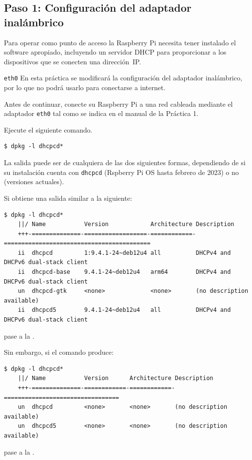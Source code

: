 \documentclass[letterpaper,10.5pt]{article}
\begin{document}
%
%
\subsection{Paso 1: Configuración del adaptador inalámbrico}%
\label{sec:adapter}

Para operar como punto de acceso la Raspberry Pi necesita tener instalado el software apropiado, incluyendo un servidor DHCP para proporcionar a los dispositivos que se conecten una dirección~IP. %

\begin{yellowbox}{\texttt{eth0}}
	En esta práctica se modificará la configuración del adaptador inalámbrico, por lo que no podrá usarlo para conectarse a internet.

	Antes de continuar, conecte su Raspberry Pi a una red cableada mediante el adaptador \texttt{eth0} tal como se indica en el manual de la Práctica 1.
\end{yellowbox}

Ejecute el siguiente comando.
\begin{Verbatim}[gobble=1,commentchar=\%]
	$ dpkg -l dhcpcd*
\end{Verbatim}

\noindent
La salida puede ser de cualquiera de las dos siguientes formas, dependiendo de si su instalación cuenta con \texttt{dhcpcd} (Rspberry Pi OS hasta febrero de 2023) o no (versiones actuales).

\medskip{}

\noindent
Si obtiene una salida similar a la siguiente:
\begin{Verbatim}[gobble=1,commentchar=\%]
	$ dpkg -l dhcpcd*
	||/ Name           Version            Architecture Description
	+++-==============-==================-============-==========================================
	ii  dhcpcd         1:9.4.1-24~deb12u4 all          DHCPv4 and DHCPv6 dual-stack client
	ii  dhcpcd-base    9.4.1-24~deb12u4   arm64        DHCPv4 and DHCPv6 dual-stack client
	un  dhcpcd-gtk     <none>             <none>       (no description available)
	ii  dhcpcd5        9.4.1-24~deb12u4   all          DHCPv4 and DHCPv6 dual-stack client
\end{Verbatim}
\noindent
pase a la .

\bigskip{}

\noindent
Sin embargo, si el comando produce:
\begin{Verbatim}[gobble=1,commentchar=\%]
	$ dpkg -l dhcpcd*
	||/ Name           Version      Architecture Description
	+++-==============-============-============-=================================
	un  dhcpcd         <none>       <none>       (no description available)
	un  dhcpcd5        <none>       <none>       (no description available)
\end{Verbatim}
\noindent
pase a la .
\end{document}
